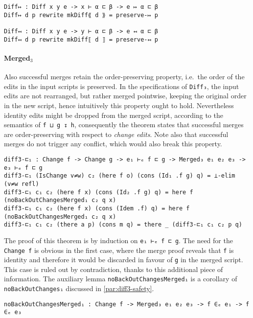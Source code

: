 \documentclass[../Thesis.tex]{subfiles}
\begin{document}
\begin{verbatim}
Diff↦ : Diff x y e -> x ⊢ α ⊏ β -> e ↦ α ⊏ β
Diff↦ d p rewrite mkDiff⟪ d ⟫ = preserve-↦ p

Diff↤ : Diff x y e -> y ⊢ α ⊏ β -> e ↤ α ⊏ β
Diff↤ d p rewrite mkDiff⟦ d ⟧ = preserve-↤ p
\end{verbatim}

	\paragraph{Merged$_3$}
	Also successful merges retain the order-preserving property, i.e.\
	the order of the edits in the input scripts is preserved.
	In the specifications of \texttt{Diff₃}, the input edits are not rearranged, 
	but rather merged pointwise, keeping the original order in the new script,
	hence intuitively this property ought to hold.
	Nevertheless identity edits might be dropped from the merged script, 
	according to the semantics of \texttt{f ⊔ g ↧ h},
	consequently the theorem states that successful merges are 
	order-preserving with respect to \emph{change edits}.
	Note also that successful merges do not trigger any conflict, which
	would also break this property.
	
\begin{verbatim}
diff3-⊏₁ : Change f -> Change g -> e₁ ⊢ₑ f ⊏ g -> Merged₃ e₁ e₂ e₃ -> e₃ ⊢ₑ f ⊏ g
diff3-⊏₁ (IsChange v≠w) c₂ (here f o) (cons (Id₁ .f g) q) = ⊥-elim (v≠w refl)
diff3-⊏₁ c₁ c₂ (here f x) (cons (Id₂ .f g) q) = here f (noBackOutChangesMerged₁ c₂ q x)
diff3-⊏₁ c₁ c₂ (here f x) (cons (Idem .f) q) = here f (noBackOutChangesMerged₁ c₂ q x)
diff3-⊏₁ c₁ c₂ (there a p) (cons m q) = there _ (diff3-⊏₁ c₁ c₂ p q)
\end{verbatim}
  
	The proof of this theorem is by induction on \texttt{e₁ ⊢ₑ f ⊏ g}.
	The need for the \texttt{Change f} is obvious in the first case, where
	the merge proof reveals that \texttt{f} is identity and therefore it would be 
	discarded	in favour of \texttt{g} in the merged script.
	This case is ruled out by contradiction, thanks to this additional piece
	of information.
	The auxiliary lemma \texttt{noBackOutChangesMerged₁} is a corollary 
	of \texttt{noBackOutChanges₁} discussed in \ref{par:diff3-safety}.
		
\begin{verbatim}
noBackOutChangesMerged₁ : Change f -> Merged₃ e₁ e₂ e₃ -> f ∈ₑ e₁ -> f ∈ₑ e₃
\end{verbatim}
	
\end{document}
